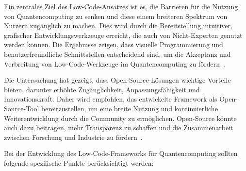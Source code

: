 Ein zentrales Ziel des Low-Code-Ansatzes ist es, die Barrieren für die Nutzung von Quantencomputing zu senken und 
diese einem breiteren Spektrum von Nutzern zugänglich zu machen. Dies wird durch die Bereitstellung intuitiver, grafischer 
Entwicklungswerkzeuge erreicht, die auch von Nicht-Experten genutzt werden können. Die Ergebnisse zeigen, dass visuelle 
Programmierung und benutzerfreundliche Schnittstellen entscheidend sind, um die Akzeptanz und Verbreitung von Low-Code-Werkzeuge 
im Quantencomputing zu fördern~\cite{Khorram_2020}.

Die Untersuchung hat gezeigt, dass Open-Source-Lösungen wichtige Vorteile bieten, darunter erhöhte Zugänglichkeit, 
Anpassungsfähigkeit und Innovationskraft. Daher wird empfohlen, das entwickelte Framework als Open-Source-Tool bereitzustellen, 
um eine breite Nutzung und kontinuierliche Weiterentwicklung durch die Community zu ermöglichen. Open-Source könnte 
auch dazu beitragen, mehr Transparenz zu schaffen und die Zusammenarbeit zwischen Forschung und 
Industrie zu fördern~\cite{Cabot_2020}.

Bei der Entwicklung des Low-Code-Frameworks für Quantencomputing sollten folgende spezifische Punkte berücksichtigt werden:


